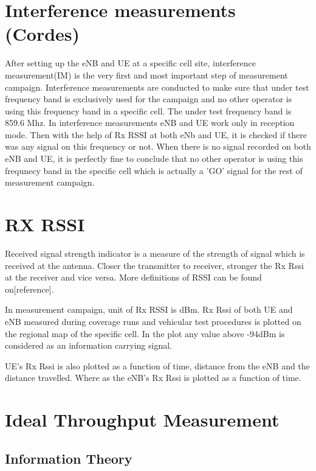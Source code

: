 \documentclass[a4paper,10pt]{article}
\begin{document}
\section{Interference measurements (Cordes)}

After setting up the eNB and UE at a specific cell site, interference measurement(IM) is the very first and most important step of measurement campaign. Interference measurements are conducted to make sure that under test frequency band is exclusively used for the campaign and no other operator is using this frequency band in a specific cell. The under test frequency band is 859.6 Mhz. In interference measurements eNB and UE work only in reception mode. Then with the help of Rx RSSI at both eNb and UE, it is checked if there was any signal on this frequency or not. When there is no signal recorded on both eNB and UE, it is perfectly fine to conclude that no other operator is using this frequnecy band in the specific cell which is actually a 'GO' signal for the rest of measurement campaign.



\section{RX RSSI}

Received signal strength indicator is a measure of the strength of signal which is received at the antenna. Closer the transmitter to receiver, stronger the Rx Rssi at the receiver and vice versa. More definitions of RSSI can be found on[reference].

In measurement campaign, unit of Rx RSSI is dBm. Rx Rssi of both UE and eNB measured during coverage runs and vehicular test procedures is plotted on the regional map of the specific cell. In the plot any value above -94dBm is considered as an information carrying signal. 

UE's Rx Rssi is also plotted as a function of time, distance from the eNB and the distance travelled. Where as the eNB's Rx Rssi is plotted as a function of time. 


\section{Ideal Throughput Measurement}

\subsection{Information Theory}
\end{document}
